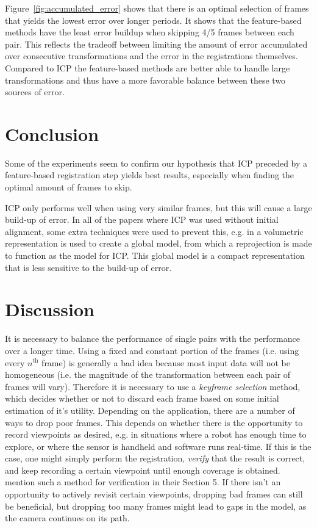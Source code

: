 \documentclass[a4paper]{article}
\begin{document}
Figure~\ref{fig:accumulated_error} shows that there is an optimal selection of frames that yields the lowest error over longer periods. It shows that the feature-based methods have the least error buildup when skipping 4/5 frames between each pair. This reflects the tradeoff between limiting the amount of error accumulated over consecutive transformations and the error in the registrations themselves. Compared to \ac{ICP} the feature-based methods are better able to handle large transformations and thus have a more favorable balance between these two sources of error.



\section{Conclusion}
Some of the experiments seem to confirm our hypothesis that \ac{ICP} preceded by a feature-based registration step yields best results, especially when finding the optimal amount of frames to skip.

\ac{ICP} only performs well when using very similar frames, but this will cause a large build-up of error. In all of the papers where \ac{ICP} was used without initial alignment, some extra techniques were used to prevent this, e.g. in \cite{izadi2011kinectfusion} a volumetric representation is used to create a global model, from which a reprojection is made to function as the model for \ac{ICP}. This global model is a compact representation that is less sensitive to the build-up of error.

\section{Discussion}
It is necessary to balance the performance of single pairs with the performance over a longer time. Using a fixed and constant portion of the frames (i.e. using every $n^{\mathrm{th}}$ frame) is generally a bad idea because most input data will not be homogeneous (i.e. the magnitude of the transformation between each pair of frames will vary). Therefore it is necessary to use a \emph{keyframe selection} method, which decides whether or not to discard each frame based on some initial estimation of it's utility. Depending on the application, there are a number of ways to drop poor frames. This depends on whether there is the opportunity to record viewpoints as desired, e.g. in situations where a robot has enough time to explore, or where the sensor is handheld and software runs real-time. If this is the case, one might simply perform the registration, \emph{verify} that the result is correct, and keep recording a certain viewpoint until enough coverage is obtained. \cite{makadia2006fully} mention such a method for verification in their Section 5. If there isn't an opportunity to actively revisit certain viewpoints, dropping bad frames can still be beneficial, but dropping too many frames might lead to gaps in the model, as the camera continues on its path.
\end{document}
